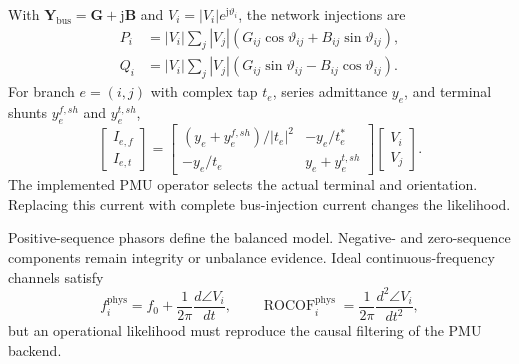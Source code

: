 \documentclass{ieeeaccess}
\begin{document}
With $\bm Y_{\mathrm{bus}}=\bm G+\mathrm j\bm B$ and $V_i=|V_i|e^{\mathrm j\vartheta_i}$, the network injections are
\begin{align}
 P_i&=|V_i|\sum_j|V_j|(G_{ij}\cos\vartheta_{ij}+B_{ij}\sin\vartheta_{ij}),\\
 Q_i&=|V_i|\sum_j|V_j|(G_{ij}\sin\vartheta_{ij}-B_{ij}\cos\vartheta_{ij}).
 \label{eq:supp-ac}
\end{align}
For branch $e=(i,j)$ with complex tap $t_e$, series admittance $y_e$, and terminal shunts $y_e^{f,sh}$ and $y_e^{t,sh}$,
\begin{equation}
 \begin{bmatrix}I_{e,f}\\I_{e,t}\end{bmatrix}=
 \begin{bmatrix}
 (y_e+y_e^{f,sh})/|t_e|^2&-y_e/t_e^*\\
 -y_e/t_e&y_e+y_e^{t,sh}
 \end{bmatrix}
 \begin{bmatrix}V_i\\V_j\end{bmatrix}.
 \label{eq:supp-terminal-current}
\end{equation}
The implemented PMU operator selects the actual terminal and orientation. Replacing this current with complete bus-injection current changes the likelihood.

Positive-sequence phasors define the balanced model. Negative- and zero-sequence components remain integrity or unbalance evidence. Ideal continuous-frequency channels satisfy
\begin{equation}
 f_i^{\mathrm{phys}}=f_0+\frac{1}{2\pi}\frac{d\angle V_i}{dt},\qquad
 \operatorname{ROCOF}_i^{\mathrm{phys}}=\frac{1}{2\pi}\frac{d^2\angle V_i}{dt^2},
\end{equation}
but an operational likelihood must reproduce the causal filtering of the PMU backend.
\end{document}
